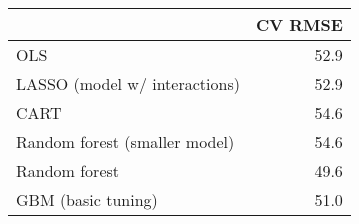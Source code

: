 
\begin{tabular}{lr}
\toprule
  & CV RMSE\\
\midrule
OLS & 52.9\\
LASSO (model w/ interactions) & 52.9\\
CART & 54.6\\
Random forest (smaller model) & 54.6\\
Random forest & 49.6\\
GBM (basic tuning) & 51.0\\
\bottomrule
\end{tabular}